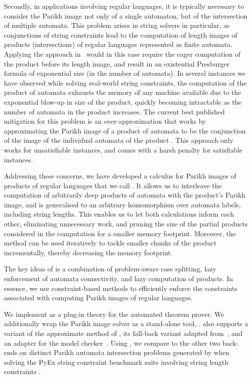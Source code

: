 Secondly, in applications involving regular languages, it is typically necessary
to consider the Parikh image not only of a single automaton, but of the
intersection of multiple automata. This problem arises in string solvers in
particular, as conjunctions of string constraints lead to the computation of
length images of products (intersections) of regular languages represented as
finite automata. Applying the approach in~\cite{generate-parikh-image} would in
this case require the eager computation of the product before its length image,
and result in an existential Presburger formula of exponential size (in the
number of automata). In several instances we have observed while solving
real-world string constraints, the computation of the product of automata
exhausts the memory of any machine available due to the exponential blow-up in
size of the product, quickly becoming intractable as the number of automata in
the product increases. The current best published mitigation for this problem is
an over-approximation that works by approximating the Parikh image of a product
of automata to be the conjunction of the image of the individual automata of the
product \cite{approximate-parikh}. This approach only works for unsatisfiable
instances, and comes with a harsh penalty for satisfiable instances.

Addressing these concerns, we have developed a calculus for Parikh images of
products of regular languages that we call \Calculus{}. It allows us to
interleave the computation of arbitrarily deep products of automata with the
product's Parikh image, and is generalised to an arbitrary homomorphism over
automata labels, including string lengths. This enables us to let both
calculations inform each other, eliminating unnecessary work, and pruning the
size of the partial products considered in the computation for a smaller memory
footprint. Moreover, the method can be used iteratively to tackle smaller chunks
of the product incrementally, thereby decreasing the memory footprint.

The key ideas of \Calculus{} is a combination of problem-aware case splitting,
lazy enforcement of automata connectivity, and lazy computation of products. In
essence, we use constraint-based methods to efficiently enforce the constraints
associated with computing Parikh images of regular languages.

We implement \Calculus{} as a plug-in theory for the \Princess{} automated
theorem prover.
%
We additionally wrap the Parikh image solver as a stand-alone tool, \Catra.
\Catra{} also supports a variant of the approximate method of
\cite{approximate-parikh}, its fall-back variant adapted
from~\cite{generate-parikh-image}, and an adapter for the \Nuxmv{} model
checker~\cite{nuxmv}. Using \Catra, we compare \Calculus{} to the other two
back-ends on \NrBenchmarks{} distinct Parikh automata intersection problems
generated by \OstrichPlus{} when solving the PyEx string constraint benchmark
suite involving string length constraints \cite{pyex}.

